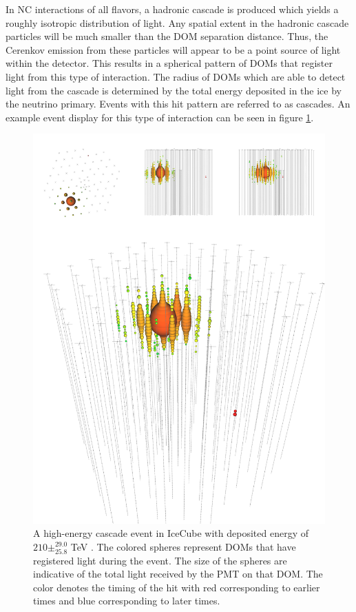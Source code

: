 \documentclass{gatech-thesis}
\begin{document}
In NC interactions of all flavors, a hadronic cascade is produced which yields a roughly isotropic distribution of light. Any spatial extent in the hadronic cascade particles will be much smaller than the DOM separation distance. Thus, the Cerenkov emission from these particles will appear to be a point source of light within the detector. This results in a spherical pattern of DOMs that register light from this type of interaction. The radius of DOMs which are able to detect light from the cascade is determined by the total energy deposited in the ice by the neutrino primary. Events with this hit pattern are referred to as cascades. An example event display for this type of interaction can be seen in figure \ref{fig:cascade}.

\begin{figure}[ht]
  \begin{center}
    \includegraphics[width=1.0\textwidth,keepaspectratio]{hese_cascade_event.png}
  \end{center}
  \caption{A high-energy cascade event in IceCube with deposited energy of $210\pm^{29.0}_{25.8}$ TeV \cite{2013Sci...342E...1I}. The colored spheres represent DOMs that have registered light during the event. The size of the spheres are indicative of the total light received by the PMT on that DOM. The color denotes the timing of the hit with red corresponding to earlier times and blue corresponding to later times.}
  \label{fig:cascade}
\end{figure}
\end{document}
